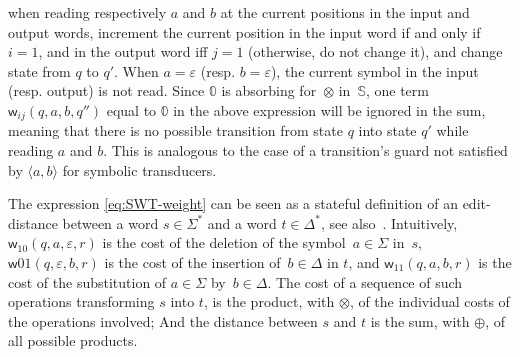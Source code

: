 \documentclass[runningheads]{llncs}
\def\<#1>{\langle #1 \rangle}
\newcommand{\Semiring}{\mathbb{S}}
\newcommand{\zero}{\mathbb{0}}
\def\weight{\mathsf{weight}}
\def\wei{\mathsf{w}}
\begin{document}
when reading respectively $a$ and $b$ at the current positions in the input and output words, 
increment the current position in the input word if and only if $i = 1$, 
and in the output word iff $j = 1$ (otherwise, do not change it),
and change state from $q$ to $q'$.
When $a = \varepsilon$ (resp. $b = \varepsilon$), the current symbol 
in the input (resp. output) is not read.
%
%
Since $\zero$ is absorbing for~$\otimes$ in~$\Semiring$,
one term $\wei_{ij}(q, a, b, q'')$ equal to $\zero$ in the above expression 
will be ignored in the sum, meaning that there is no possible transition
from state $q$ into state $q'$ while reading $a$ and $b$.
This is analogous to the case of a transition's guard not satisfied by $\<a, b>$ for 
symbolic transducers.

%

The expression \eqref{eq:SWT-weight} 
can be seen as a stateful definition of 
an edit-distance between a word $s \in \Sigma^*$ and a word $t \in \Delta^*$,
see also~\cite{Mohri03ijfcs}.
Intuitively, 
$\wei_{10}(q, a, \varepsilon, r)$ is the cost of 
the deletion of the symbol~$a \in \Sigma$ in~$s$, 
$\wei{01}(q, \varepsilon, b, r)$ is the cost 
of the insertion of~$b \in \Delta$ in $t$, 
and $\wei_{11}(q, a, b, r)$ is the cost 
of the substitution of  $a \in \Sigma$ by~$b \in \Delta$.
%
The cost of a sequence of such operations transforming $s$ into $t$, 
is the product, with $\otimes$, of the individual costs of the operations involved;
And the distance between $s$ and $t$ is the sum, with $\oplus$,
of all possible products.
\end{document}
